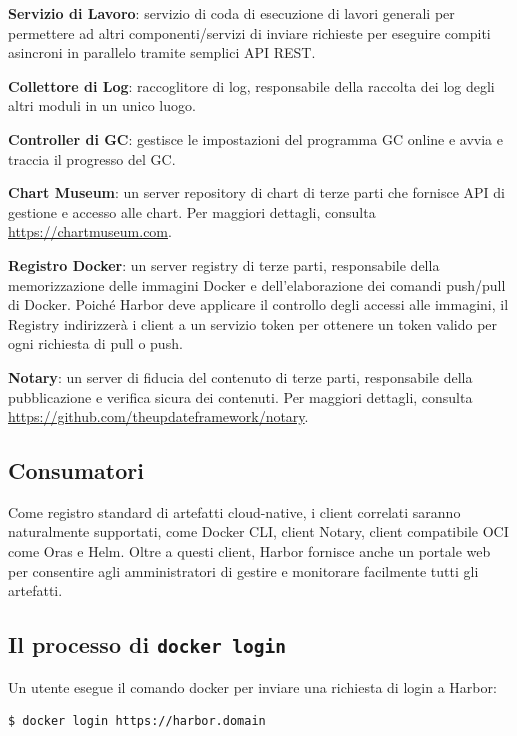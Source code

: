 \documentclass[12pt]{report}
\begin{document}
\textbf{Servizio di Lavoro}: servizio di coda di esecuzione di lavori generali per permettere ad altri componenti/servizi di inviare richieste per eseguire compiti asincroni in parallelo tramite semplici API REST.

\textbf{Collettore di Log}: raccoglitore di log, responsabile della raccolta dei log degli altri moduli in un unico luogo.

\textbf{Controller di GC}: gestisce le impostazioni del programma GC online e avvia e traccia il progresso del GC.

\textbf{Chart Museum}: un server repository di chart di terze parti che fornisce API di gestione e accesso alle chart. Per maggiori dettagli, consulta \url{https://chartmuseum.com}.

\textbf{Registro Docker}: un server registry di terze parti, responsabile della memorizzazione delle immagini Docker e dell'elaborazione dei comandi push/pull di Docker. Poiché Harbor deve applicare il controllo degli accessi alle immagini, il Registry indirizzerà i client a un servizio token per ottenere un token valido per ogni richiesta di pull o push.

\textbf{Notary}: un server di fiducia del contenuto di terze parti, responsabile della pubblicazione e verifica sicura dei contenuti. Per maggiori dettagli, consulta \url{https://github.com/theupdateframework/notary}.

\subsection{Consumatori}
Come registro standard di artefatti cloud-native, i client correlati saranno naturalmente supportati, come Docker CLI, client Notary, client compatibile OCI come Oras e Helm. Oltre a questi client, Harbor fornisce anche un portale web per consentire agli amministratori di gestire e monitorare facilmente tutti gli artefatti.

\subsection{Il processo di \texttt{docker login}}
Un utente esegue il comando docker per inviare una richiesta di login a Harbor:
\begin{verbatim}
$ docker login https://harbor.domain
\end{verbatim}
\end{document}
